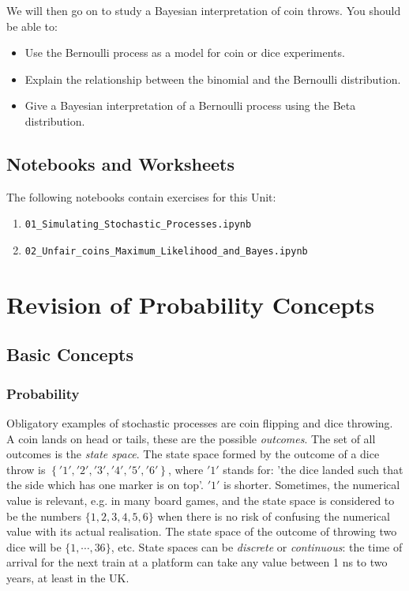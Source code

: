 We will then go on to study a Bayesian interpretation of coin throws. You
should be able to:

\begin{itemize}
\item Use the Bernoulli process as a model for coin or dice experiments.
\item Explain the relationship between the binomial and the Bernoulli distribution.
\item Give a Bayesian interpretation of a Bernoulli process using the Beta distribution.
\end{itemize}

\section{Notebooks and Worksheets}
The following notebooks contain exercises for this Unit:
\begin{enumerate}
  \item \texttt{01\_Simulating\_Stochastic\_Processes.ipynb}
  \item \texttt{02\_Unfair\_coins\_Maximum\_Likelihood\_and\_Bayes.ipynb}
\end{enumerate}
\chapter{Revision of Probability Concepts}
\section{Basic Concepts}
\subsection{Probability}

Obligatory examples of stochastic processes are coin flipping and dice throwing.
A coin lands on head or tails, these are the possible \emph{outcomes}. The set of all
outcomes is the \emph{state space}.  The state space formed by the outcome of a dice
throw is $\left\{ '1', '2', '3', '4', '5','6' \right\}$, where $'1'$ stands for:
'the dice landed such that the side which has one marker is on top'. $'1'$ is shorter.
Sometimes, the numerical value is relevant, e.g. in many board games, and the
state space is considered to be the numbers $\{1,  2, 3, 4, 5, 6\}$ when there is no
risk of confusing the numerical value with its actual realisation. The state space
of the outcome of throwing two dice will be $\{1, \cdots, 36 \}$, etc.
State spaces can be \emph{discrete} or \emph{continuous}: the time of arrival for the
next train at a platform can take any value between 1 ns to two years, at least in the UK.

